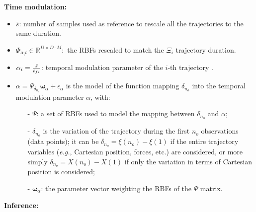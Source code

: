 \documentclass[utf8]{frontiersSCNS} %
\begin{document}
\textbf{Time modulation:}
\begin{itemize}
	\item $\bar{s}$: number of samples used as reference to rescale all the trajectories to the same duration.
	\item $\Phi_{\alpha_i t} \in \mathbb{R}^{D\times D \cdot M}:$ the RBFs rescaled to match the $\Xi_i$ trajectory duration.
	\item $\alpha_i = { \bar{s} \over t_{fi}}$: temporal modulation parameter of the $i$-th trajectory .
	\item $\alpha = \Psi_{\delta_{n_o}}\boldsymbol{\omega}_\alpha + \epsilon_\alpha$ is the model of the function mapping $\delta_{n_o}$ into the temporal modulation parameter $\alpha$, with:
	
	\begin{itemize}
		\item[-] $\Psi$: a set of RBFs used to model the mapping between $\delta_{n_o}$ and $\alpha$;
		\item[-] $\delta_{n_o}$ is the variation of the trajectory during the first $n_o$ observations (data points); it can be $\delta_{n_o}=\xi(n_o) - \xi(1)$ if the entire trajectory variables (\textit{e.g.}, Cartesian position, forces, etc.) are considered, or more simply $\delta_{n_o}= X(n_o) - X(1)$ if only the variation in terms of Cartesian position is considered;
		\item[-] $\boldsymbol{\omega}_\alpha$: the parameter vector weighting the RBFs of the $\Psi$ matrix. 
		
	\end{itemize}
\end{itemize}
\textbf{Inference:}
\end{document}
